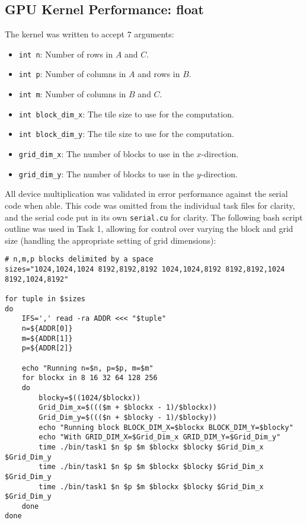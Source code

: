 \documentclass{article}
\begin{document}
\subsection{GPU Kernel Performance: float}
The kernel was written to accept $7$ arguments: 
\begin{multicols}{2}
    \begin{itemize}
        \item \texttt{int n}: Number of rows in $A$ and $C$.
        \item \texttt{int p}: Number of columns in $A$ and rows in $B$.
        \item \texttt{int m}: Number of columns in $B$ and $C$.
        \item \texttt{int block\_dim\_x}: The tile size to use for the computation.
        \item \texttt{int block\_dim\_y}: The tile size to use for the computation.
        \item \texttt{grid\_dim\_x}: The number of blocks to use in the $x$-direction.
        \item \texttt{grid\_dim\_y}: The number of blocks to use in the $y$-direction.
    \end{itemize}
\end{multicols}
\noindent All device multiplication was validated in error performance against the serial 
code when able. This code was omitted from the individual task files for clarity, 
and the serial code put in its own \texttt{serial.cu} for clarity.
The following bash script outline was used in Task 1, allowing 
for control over varying the block and grid size (handling the appropriate 
setting of grid dimensions):
\newpage
\begin{lstlisting}
# n,m,p blocks delimited by a space
sizes="1024,1024,1024 8192,8192,8192 1024,1024,8192 8192,8192,1024 8192,1024,8192"

for tuple in $sizes
do
    IFS=',' read -ra ADDR <<< "$tuple"
    n=${ADDR[0]}
    m=${ADDR[1]}
    p=${ADDR[2]}

    echo "Running n=$n, p=$p, m=$m"
    for blockx in 8 16 32 64 128 256
    do
        blocky=$((1024/$blockx))
        Grid_Dim_x=$((($m + $blockx - 1)/$blockx))
        Grid_Dim_y=$((($n + $blocky - 1)/$blocky))
        echo "Running block BLOCK_DIM_X=$blockx BLOCK_DIM_Y=$blocky"
        echo "With GRID_DIM_X=$Grid_Dim_x GRID_DIM_Y=$Grid_Dim_y"
        time ./bin/task1 $n $p $m $blockx $blocky $Grid_Dim_x $Grid_Dim_y
        time ./bin/task1 $n $p $m $blockx $blocky $Grid_Dim_x $Grid_Dim_y
        time ./bin/task1 $n $p $m $blockx $blocky $Grid_Dim_x $Grid_Dim_y
    done
done
\end{lstlisting}
\end{document}
